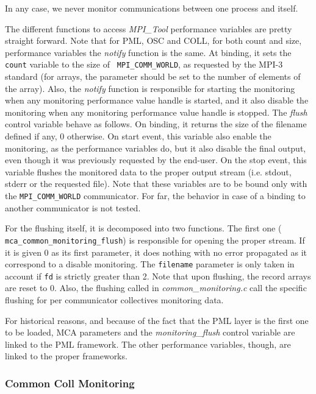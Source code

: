 \documentclass[notitlepage]{article}
\newcommand{\mpit}[1]{\textit{MPI\_Tool#1}}
\newcommand{\brkunds}[0]{\allowbreak\_}
\begin{document}
In any case, we never monitor communications between one process and
itself.

The different functions to access \mpit{} performance variables are
pretty straight forward. Note that for PML, OSC and COLL, for both
count and size, performance variables the {\it notify} function is the
same. At binding, it sets the {\tt count} variable to the size of {\tt
  MPI\brkunds{}COMM\brkunds{}WORLD}, as requested by the MPI-3
standard (for arrays, the parameter should be set to the number of
elements of the array). Also, the {\it notify} function is responsible
for starting the monitoring when any monitoring performance value
handle is started, and it also disable the monitoring when any
monitoring performance value handle is stopped. The {\it flush}
control variable behave as follows. On binding, it returns the size of
the filename defined if any, 0 otherwise. On start event, this
variable also enable the monitoring, as the performance variables do,
but it also disable the final output, even though it was previously
requested by the end-user. On the stop event, this variable flushes
the monitored data to the proper output stream (i.e. stdout, stderr or
the requested file). Note that these variables are to be bound only
with the {\tt MPI\brkunds{}COMM\brkunds{}WORLD} communicator. For far,
the behavior in case of a binding to another communicator is not
tested.

For the flushing itself, it is decomposed into two functions. The
first one ({\tt
  mca\brkunds{}common\brkunds{}monitoring\brkunds{}flush}) is
responsible for opening the proper stream. If it is given 0 as its
first parameter, it does nothing with no error propagated as it
correspond to a disable monitoring. The {\tt filename} parameter is
only taken in account if {\tt fd} is strictly greater than 2. Note
that upon flushing, the record arrays are reset to 0. Also, the
flushing called in {\it common\brkunds{}monitoring.c} call the
specific flushing for per communicator collectives monitoring data.

For historical reasons, and because of the fact that the PML layer is
the first one to be loaded, MCA parameters and the {\it
  monitoring\brkunds{}flush} control variable are linked to the PML
framework. The other performance variables, though, are linked to the
proper frameworks.

\subsubsection{Common Coll Monitoring}
\label{subsubsec:TDI-common-coll}
\end{document}
